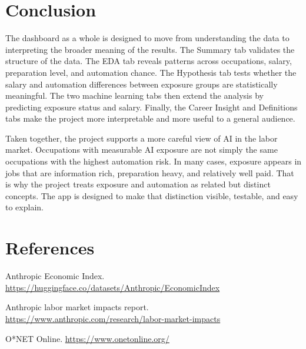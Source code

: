 \documentclass[11pt]{article}
\begin{document}
\section*{Conclusion}

The dashboard as a whole is designed to move from understanding the data to interpreting the broader meaning of the results. The Summary tab validates the structure of the data. The EDA tab reveals patterns across occupations, salary, preparation level, and automation chance. The Hypothesis tab tests whether the salary and automation differences between exposure groups are statistically meaningful. The two machine learning tabs then extend the analysis by predicting exposure status and salary. Finally, the Career Insight and Definitions tabs make the project more interpretable and more useful to a general audience.

Taken together, the project supports a more careful view of AI in the labor market. Occupations with measurable AI exposure are not simply the same occupations with the highest automation risk. In many cases, exposure appears in jobs that are information rich, preparation heavy, and relatively well paid. That is why the project treats exposure and automation as related but distinct concepts. The app is designed to make that distinction visible, testable, and easy to explain.

\section*{References}

Anthropic Economic Index. \url{https://huggingface.co/datasets/Anthropic/EconomicIndex}

Anthropic labor market impacts report. \url{https://www.anthropic.com/research/labor-market-impacts}

O*NET Online. \url{https://www.onetonline.org/}
\end{document}
